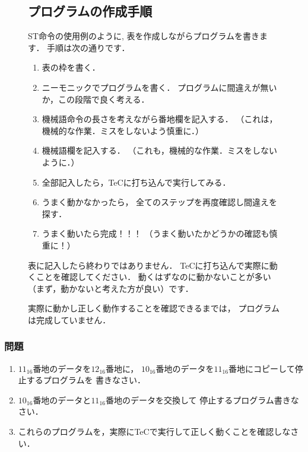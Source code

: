 \begin{figure}[tbp]
\begin{framed}
\subsection*{プログラムの作成手順}
ST命令の使用例のように,
表を作成しながらプログラムを書きます．
手順は次の通りです．
\begin{enumerate}
\item 表の枠を書く．
\item ニーモニックでプログラムを書く．
プログラムに間違えが無いか，この段階で良く考える．
\item 機械語命令の長さを考えながら番地欄を記入する．
（これは，機械的な作業．ミスをしないよう慎重に．）
\item 機械語欄を記入する．
（これも，機械的な作業．ミスをしないように．）
\item 全部記入したら，TeCに打ち込んで実行してみる．
\item うまく動かなかったら，
全てのステップを再度確認し間違えを探す．
\item うまく動いたら完成！！！
（うまく動いたかどうかの確認も慎重に！）
\end{enumerate}

表に記入したら終わりではありません．
TeCに打ち込んで実際に動くことを確認してください．
動くはずなのに動かないことが多い（まず，動かないと考えた方が良い）です．

実際に動かし正しく動作することを確認できるまでは，
プログラムは完成していません．
\end{framed}
\end{figure}

\vfill
\subsubsection{問題}
\begin{enumerate}
\item $11_{16}$番地のデータを$12_{16}$番地に，
$10_{16}$番地のデータを$11_{16}$番地にコピーして停止するプログラムを
書きなさい．
\item $10_{16}$番地のデータと$11_{16}$番地のデータを交換して
停止するプログラム書きなさい．
\item これらのプログラムを，実際にTeCで実行して正しく動くことを確認しなさい．
\end{enumerate}
\vfill

